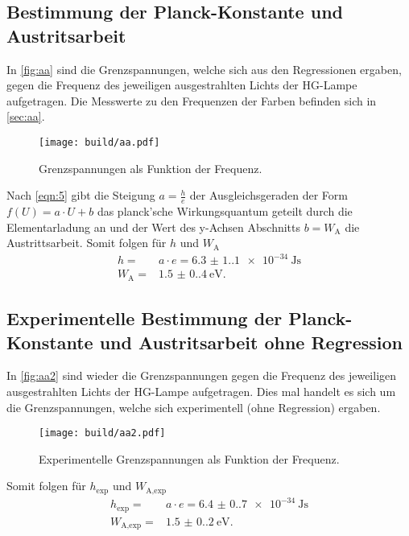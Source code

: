 \subsection{Bestimmung der Planck-Konstante und Austritsarbeit}
\label{sec:planckWa1}
\noindent In \autoref{fig:aa} sind die Grenzspannungen, welche sich aus den 
Regressionen ergaben, gegen die Frequenz des jeweiligen ausgestrahlten Lichts
der HG-Lampe aufgetragen. Die Messwerte zu den Frequenzen der Farben befinden
sich in \autoref{sec:aa}. 
\begin{figure}[H]
    \centering
    \caption{Grenzspannungen als Funktion der Frequenz.}
    \label{fig:aa}
    \texttt{[image: build/aa.pdf]}
\end{figure} 
\noindent Nach \autoref{eqn:5} gibt die Steigung $a = \frac{h}{e}$ der Ausgleichsgeraden der Form $f(U) = a\cdot U + b$ das planck'sche Wirkungsquantum geteilt durch die 
Elementarladung an und der Wert des y-Achsen Abschnitts $b =  W_\text{A}$
die Austrittsarbeit. Somit folgen für $h$ und $W_\text{A}$
\begin{align}
    h =& a\cdot e = \qty{6.3(1.1)e-34}{\joule\second}\\
    W_\text{A} =& \qty{1.5(0.4)}{\eV}.
\end{align}

\subsection{Experimentelle Bestimmung der Planck-Konstante und Austritsarbeit ohne Regression}
\label{sec:planckWa2}
\noindent In \autoref{fig:aa2} sind wieder die Grenzspannungen gegen die 
Frequenz des jeweiligen ausgestrahlten Lichts der HG-Lampe aufgetragen. 
Dies mal handelt es sich um die Grenzspannungen, welche sich experimentell 
(ohne Regression) ergaben.
\begin{figure}[H]
    \centering
    \caption{Experimentelle Grenzspannungen als Funktion der Frequenz.}
    \label{fig:aa2}
    \texttt{[image: build/aa2.pdf]}
\end{figure} 
\noindent Somit folgen für $h_\text{exp} $ und $W_\text{A,exp}$
\begin{align}
    h_\text{exp} =& a\cdot e = \qty{6.4(0.7)e-34}{\joule\second}\\
    W_\text{A,exp} =& \qty{1.5(0.2)}{\eV}.
\end{align}